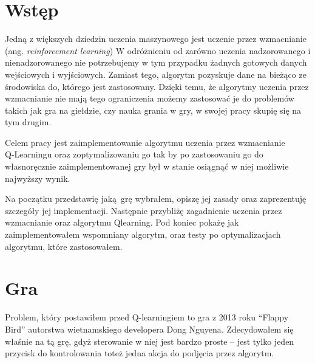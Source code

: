 \documentclass[a4paper,12pt,oneside]{book}
\newcommand\chap[1]{%
  \chapter*{#1}%
  \addcontentsline{toc}{chapter}{#1}}
\begin{document}
\sloppy
\thispagestyle{empty}

\newpage{}

\thispagestyle{empty}
\newpage{}

\tableofcontents{}
\newpage


\chap{Wstęp}
Jedną z większych dziedzin uczenia maszynowego jest uczenie przez wzmacnianie (ang.
\textit{reinforcement learning}) W odróżnieniu od zarówno uczenia nadzorowanego i 
nienadzorowanego nie potrzebujemy w tym przypadku żadnych gotowych danych wejściowych i
wyjściowych. Zamiast tego, algorytm pozyskuje dane na bieżąco ze środowiska do, którego
jest zastosowany. Dzięki temu, że algorytmy uczenia przez wzmacnianie nie mają tego
ograniczenia możemy zastosować je do problemów takich jak gra na giełdzie\cite{
trading_reinforcement}, czy nauka grania w gry, w swojej pracy
skupię się na tym drugim.

Celem pracy jest zaimplementowanie algorytmu uczenia przez wzmacnianie \\
Q-Learningu oraz zoptymalizowaniu go tak by po zastosowaniu go do własnoręcznie
zaimplementowanej gry był w stanie osiągnąć w niej możliwie najwyższy wynik.

Na początku przedstawię jaką grę wybrałem, opiszę jej zasady oraz zaprezentuję
szczegóły jej implementacji. Następnie  przybliżę zagadnienie uczenia przez
wzmacnianie oraz algorytmu Q\dywiz learning. Pod koniec pokażę jak
zaimplementowałem wspomniany algorytm, oraz testy po optymalizacjach algorytmu,
które zastosowałem.
\newpage{}

\chapter{Gra}
Problem, który postawiłem przed Q-learningiem to gra z 2013 roku ``Flappy Bird''
autorstwa wietnamskiego developera Dong Nguyena\cite{flappy_bird_author}.
Zdecydowałem się właśnie na tą grę, gdyż sterowanie w niej jest bardzo proste --
jest tylko jeden przycisk do kontrolowania toteż jedna akcja do podjęcia przez
algorytm.
\end{document}
